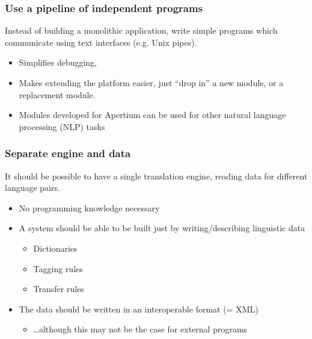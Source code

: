 \documentclass[10pt,xetex]{beamer} %
\begin{document}
\begin{frame}
  \frametitle{Use a pipeline of independent programs}

Instead of building a monolithic application, write simple programs which
communicate using text interfaces (e.g. Unix pipes).

\begin{itemize}
  \item Simplifies debugging, 
  \item Makes extending the platform easier, just ``drop in'' a new module, or
      a replacement module.
  \item Modules developed for Apertium can be used for other natural language
      processing (NLP) tasks
\end{itemize}

\end{frame}

\begin{frame}
  \frametitle{Separate engine and data}

It should be possible to have a single translation engine, reading data for different
language pairs.

  \begin{itemize}
    \item No programming knowledge necessary
    \item A system should be able to be built just by writing/describing linguistic data
    \begin{itemize}
      \item Dictionaries
      \item Tagging rules
      \item Transfer rules
    \end{itemize}
    \item The data should be written in an interoperable format (= XML)
    \begin{itemize}
      \item \ldots although this may not be the case for external programs
    \end{itemize}
      
  \end{itemize}

\end{frame}
\end{document}
